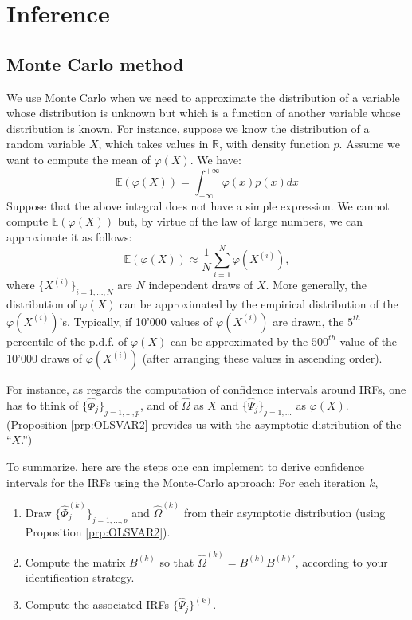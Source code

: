 \documentclass[
  12pt,
]{book}
\providecommand{\tightlist}{%
  \setlength{\itemsep}{0pt}\setlength{\parskip}{0pt}}
\theoremstyle{definition}
\theoremstyle{definition}
\theoremstyle{definition}
\theoremstyle{definition}
\theoremstyle{remark}
\begin{document}
\hypertarget{Inference}{%
\section{Inference}\label{Inference}}

\hypertarget{MonteCarlo}{%
\subsection{Monte Carlo method}\label{MonteCarlo}}

We use Monte Carlo when we need to approximate the distribution of a variable whose distribution is unknown but which is a function of another variable whose distribution is known. For instance, suppose we know the distribution of a random variable \(X\), which takes values in \(\mathbb{R}\), with density function \(p\). Assume we want to compute the mean of \(\varphi(X)\). We have:
\[
\mathbb{E}(\varphi(X))=\int_{-\infty}^{+\infty}\varphi(x)p(x)dx
\]
Suppose that the above integral does not have a simple expression. We cannot compute \(\mathbb{E}(\varphi(X))\) but, by virtue of the law of large numbers, we can approximate it as follows:
\[
\mathbb{E}(\varphi(X))\approx\frac{1}{N}\sum_{i=1}^N\varphi(X^{(i)}),
\]
where \(\{X^{(i)}\}_{i=1,...,N}\) are \(N\) independent draws of \(X\). More generally, the distribution of \(\varphi(X)\) can be approximated by the empirical distribution of the \(\varphi(X^{(i)})\)'s. Typically, if 10'000 values of \(\varphi(X^{(i)})\) are drawn, the \(5^{th}\) percentile of the p.d.f. of \(\varphi(X)\) can be approximated by the \(500^{th}\) value of the 10'000 draws of \(\varphi(X^{(i)})\) (after arranging these values in ascending order).

For instance, as regards the computation of confidence intervals around IRFs, one has to think of \(\{\widehat{\Phi}_j\}_{j=1,...,p}\), and of \(\widehat{\Omega}\) as \(X\) and \(\{\widehat{\Psi}_j\}_{j=1,...}\) as \(\varphi(X)\). (Proposition \ref{prp:OLSVAR2} provides us with the asymptotic distribution of the ``\(X\).'')

To summarize, here are the steps one can implement to derive confidence intervals for the IRFs using the Monte-Carlo approach: For each iteration \(k\),

\begin{enumerate}
\def\labelenumi{\arabic{enumi}.}
\tightlist
\item
  Draw \(\{\widehat{\Phi}_j^{(k)}\}_{j=1,...,p}\) and \(\widehat{\Omega}^{(k)}\) from their asymptotic distribution (using Proposition \ref{prp:OLSVAR2}).
\item
  Compute the matrix \(B^{(k)}\) so that \(\widehat{\Omega}^{(k)}=B^{(k)}B^{(k)'}\), according to your identification strategy.
\item
  Compute the associated IRFs \(\{\widehat{\Psi}_j\}^{(k)}\).
\end{enumerate}
\end{document}

